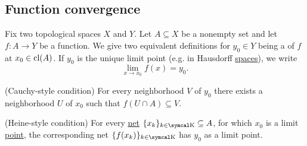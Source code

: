 \subsection{Function convergence}\label{subsec:function_convergence}

\begin{Definition}\label{def:local_convergence}
  Fix two topological spaces \( X \) and \( Y \). Let \( A \subseteq X \) be a nonempty set and let \( f: A \to Y \) be a function. We give two equivalent definitions for \( y_0 \in Y \) being a  of \( f \) at \( x_0 \in \operatorname{cl}(A) \). If \( y_0 \) is the unique limit point (e.g. in Hausdorff \hyperref[thm:t2_iff_singleton_limits]{spaces}), we write
  \begin{equation*}
    \lim_{x \to x_0} f(x) = y_0.
  \end{equation*}

  \begin{DefEnum}
    (Cauchy-style condition) For every neighborhood \( V \) of \( y_0 \) there exists a neighborhood \( U \) of \( x_0 \) such that \( f(U \cap A) \subseteq V \).

    (Heine-style condition) For every \hyperref[def:topological_net]{net} \( \{ x_k \}_{k \in \CK} \subseteq A \), for which \( x_0 \) is a limit \hyperref[def:net_convergence/limit]{point}, the corresponding net \( \{ f(x_k) \}_{k \in \CK} \) has \( y_0 \) as a limit point.
  \end{DefEnum}
\end{Definition}
